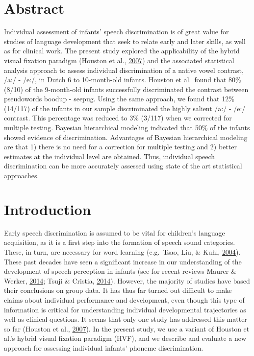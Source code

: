 \documentclass[openright,titlepage,12pt,a4paper]{book}
\begin{document}
\hypertarget{abstract-2}{%
\section*{Abstract}\label{abstract-2}}

\small

Individual assessment of infants' speech discrimination is of great value for studies of language development that seek to relate early and later skills, as well as for clinical work. The present study explored the applicability of the hybrid visual fixation paradigm (Houston et al., \protect\hyperlink{ref-houston_assessing_2007}{2007}) and the associated statistical analysis approach to assess individual discrimination of a native vowel contrast, /a:/ - /e:/, in Dutch 6 to 10-month-old infants. Houston et al.~found that 80\% (8/10) of the 9-month-old infants successfully discriminated the contrast between pseudowords boodup - seepug. Using the same approach, we found that 12\% (14/117) of the infants in our sample discriminated the highly salient /a:/ - /e:/ contrast. This percentage was reduced to 3\% (3/117) when we corrected for multiple testing. Bayesian hierarchical modeling indicated that 50\% of the infants showed evidence of discrimination. Advantages of Bayesian hierarchical modeling are that 1) there is no need for a correction for multiple testing and 2) better estimates at the individual level are obtained. Thus, individual speech discrimination can be more accurately assessed using state of the art statistical approaches.

\normalsize
\newpage

\hypertarget{ch04introduction}{%
\section{Introduction}\label{ch04introduction}}

Early speech discrimination is assumed to be vital for children's language acquisition, as it is a first step into the formation of speech sound categories. These, in turn, are necessary for word learning (e.g.~Tsao, Liu, \& Kuhl, \protect\hyperlink{ref-tsao_speech_2004}{2004}). These past decades have seen a significant increase in our understanding of the development of speech perception in infants (see for recent reviews Maurer \& Werker, \protect\hyperlink{ref-maurer_perceptual_2014}{2014}; Tsuji \& Cristia, \protect\hyperlink{ref-tsuji_perceptual_2014}{2014}). However, the majority of studies have based their conclusions on group data. It has thus far turned out difficult to make claims about individual performance and development, even though this type of information is critical for understanding individual developmental trajectories as well as clinical questions. It seems that only one study has addressed this matter so far (Houston et al., \protect\hyperlink{ref-houston_assessing_2007}{2007}). In the present study, we use a variant of Houston et al.'s hybrid visual fixation paradigm (HVF), and we describe and evaluate a new approach for assessing individual infants' phoneme discrimination.
\end{document}
